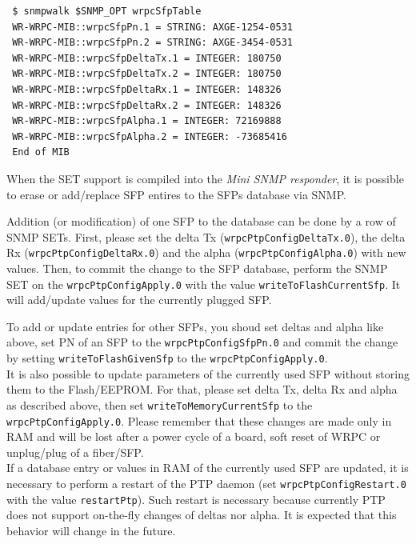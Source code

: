 \documentclass[a4paper, 12pt]{article}
\renewcommand{\_}{\underscore\allowbreak}
\begin{document}
\begin{lstlisting}
 $ snmpwalk $SNMP_OPT wrpcSfpTable
 WR-WRPC-MIB::wrpcSfpPn.1 = STRING: AXGE-1254-0531
 WR-WRPC-MIB::wrpcSfpPn.2 = STRING: AXGE-3454-0531
 WR-WRPC-MIB::wrpcSfpDeltaTx.1 = INTEGER: 180750
 WR-WRPC-MIB::wrpcSfpDeltaTx.2 = INTEGER: 180750
 WR-WRPC-MIB::wrpcSfpDeltaRx.1 = INTEGER: 148326
 WR-WRPC-MIB::wrpcSfpDeltaRx.2 = INTEGER: 148326
 WR-WRPC-MIB::wrpcSfpAlpha.1 = INTEGER: 72169888
 WR-WRPC-MIB::wrpcSfpAlpha.2 = INTEGER: -73685416
 End of MIB
\end{lstlisting}
When the SET support is compiled into the \textit{Mini SNMP responder}, it is
possible to erase or add/replace SFP entires to the SFPs database via SNMP.\\

\begin{sloppypar} %
Addition (or modification) of one SFP to the database can be done by a row of
SNMP SETs. First, please set the delta Tx (\texttt{wrpcPtpConfigDeltaTx.0}), the
delta Rx (\texttt{wrpcPtpConfigDeltaRx.0}) and the alpha (\texttt{wrpcPtpConfigAlpha.0})
with new values. Then, to commit the change to the SFP database, perform the SNMP SET on
the \texttt{wrpcPtpConfigApply.0} with the value \texttt{writeToFlashCurrentSfp}. It will
add/update values for the currently plugged SFP.
\end{sloppypar}

To add or update entries for other SFPs, you shoud set deltas and alpha like
above, set PN of an SFP to the \texttt{wrpcPtpConfigSfpPn.0} and commit
the change by setting \texttt{writeToFlashGivenSfp} to the
\texttt{wrpcPtpConfigApply.0}.\\

It is also possible to update parameters of the currently used SFP without
storing them to the Flash/EEPROM. For that, please set delta Tx, delta Rx and
alpha as described above, then set \texttt{writeToMemoryCurrentSfp} to the
\texttt{wrpcPtpConfigApply.0}. Please remember that these changes are made only
in RAM and will be lost after a power cycle of a board, soft reset of WRPC or
unplug/plug of a fiber/SFP.\\

If a database entry or values in RAM of the currently used SFP are updated, it is
necessary to perform a restart of the PTP daemon
(set \texttt{wrpcPtpConfigRestart.0} with the value \texttt{restartPtp}). Such
restart is necessary because currently PTP does not support on-the-fly changes
of deltas nor alpha. It is expected that this behavior will change in the
future.\\
\end{document}
